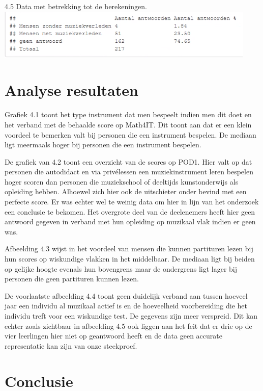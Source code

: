 \documentclass{hogent-article}
\begin{document}
4.5 Data met betrekking tot de berekeningen.\newline
\includegraphics[scale=0.5]{../rapport/img/5.PNG}

\section{Analyse resultaten}

Grafiek 4.1 toont het type instrument dat men bespeelt indien men dit doet en het verband met de behaalde score op Math4IT. Dit toont aan dat er een klein voordeel te bemerken valt bij personen die een instrument bespelen. De mediaan ligt meermaals hoger bij personen die een instrument bespelen. 

De grafiek van 4.2 toont een overzicht van de scores op POD1. Hier valt op dat personen die autodidact en via privélessen een muziekinstrument leren bespelen hoger scoren dan personen die muziekschool of deeltijds kunstonderwijs als opleiding hebben. Alhoewel zich hier ook de uitschieter onder bevind met een perfecte score. Er was echter wel te weinig data om hier in lijn van het onderzoek een conclusie te bekomen. Het overgrote deel van de deelenemers heeft hier geen antwoord gegeven in verband met hun opleiding op muzikaal vlak indien er geen was.

Afbeelding 4.3 wijst in het voordeel van mensen die kunnen partituren lezen bij hun scores op wiskundige vlakken in het middelbaar. De mediaan ligt bij beiden op gelijke hoogte evenals hun bovengrens maar de ondergrens ligt lager bij personen die geen partituren kunnen lezen.

De voorlaatste afbeelding 4.4 toont geen duidelijk verband aan tussen hoeveel jaar een individu al muzikaal actief is en de hoeveelheid voorbereiding die het individu treft voor een wiskundige test. De gegevens zijn meer verspreid. Dit kan echter zoals zichtbaar in afbeelding 4.5 ook liggen aan het feit dat er drie op de vier leerlingen hier niet op geantwoord heeft en de data geen accurate representatie kan zijn van onze steekproef.

\section{Conclusie}
\end{document}
